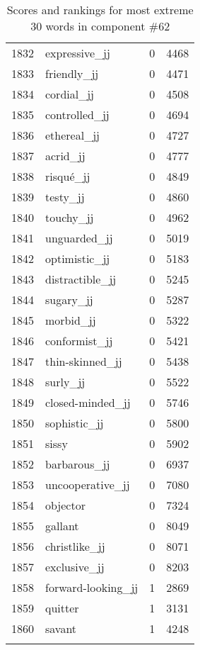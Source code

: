 \begin{longtable}[!htbp]{| rlr@{.}l |}
    1832 & expressive\_jj & 0 & 4468 \\
    1833 & friendly\_jj & 0 & 4471 \\
    1834 & cordial\_jj & 0 & 4508 \\
    1835 & controlled\_jj & 0 & 4694 \\
    1836 & ethereal\_jj & 0 & 4727 \\
    1837 & acrid\_jj & 0 & 4777 \\
    1838 & risqué\_jj & 0 & 4849 \\
    1839 & testy\_jj & 0 & 4860 \\
    1840 & touchy\_jj & 0 & 4962 \\
    1841 & unguarded\_jj & 0 & 5019 \\
    1842 & optimistic\_jj & 0 & 5183 \\
    1843 & distractible\_jj & 0 & 5245 \\
    1844 & sugary\_jj & 0 & 5287 \\
    1845 & morbid\_jj & 0 & 5322 \\
    1846 & conformist\_jj & 0 & 5421 \\
    1847 & thin-skinned\_jj & 0 & 5438 \\
    1848 & surly\_jj & 0 & 5522 \\
    1849 & closed-minded\_jj & 0 & 5746 \\
    1850 & sophistic\_jj & 0 & 5800 \\
    1851 & sissy & 0 & 5902 \\
    1852 & barbarous\_jj & 0 & 6937 \\
    1853 & uncooperative\_jj & 0 & 7080 \\
    1854 & objector & 0 & 7324 \\
    1855 & gallant & 0 & 8049 \\
    1856 & christlike\_jj & 0 & 8071 \\
    1857 & exclusive\_jj & 0 & 8203 \\
    1858 & forward-looking\_jj & 1 & 2869 \\
    1859 & quitter & 1 & 3131 \\
    1860 & savant & 1 & 4248 \\
    \hline
    \caption{Scores and rankings for most extreme 30 words in component \#62} \\
\end{longtable}
